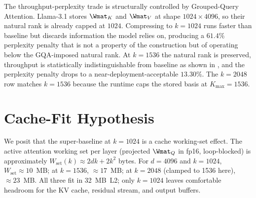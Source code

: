 \documentclass[11pt]{article}
\begin{document}
The throughput-perplexity trade is structurally controlled by Grouped-Query
Attention. Llama-3.1 stores $\Wmat_K$ and $\Wmat_V$ at shape $1024\times4096$,
so their natural rank is already capped at $1024$. Compressing to $k{=}1024$
runs faster than baseline but discards information the model relies on,
producing a $61.4\%$ perplexity penalty that is not a property of the
construction but of operating below the GQA-imposed natural rank. At
$k{=}1536$ the natural rank is preserved, throughput is statistically
indistinguishable from baseline as shown in , and the
perplexity penalty drops to a near-deployment-acceptable $13.30\%$. The
$k{=}2048$ row matches $k{=}1536$ because the runtime caps the stored basis
at $K_\text{max}{=}1536$.

\section{Cache-Fit Hypothesis}
\label{sec:cachefit}
We posit that the super-baseline at $k{=}1024$ is a cache working-set effect.
The active attention working set per layer (projected $\Wmat_Q$ in fp16,
loop-blocked) is approximately $W_\text{set}(k) \approx 2 d k\!+\!2 k^2$ bytes.
For $d{=}4096$ and $k{=}1024$, $W_\text{set}\!\approx\!10$~MB; at $k{=}1536$,
$\approx\!17$~MB; at $k{=}2048$ (clamped to 1536 here), $\approx\!23$~MB.  All
three fit in 32~MB~L2; only $k{=}1024$ leaves comfortable headroom for the KV
cache, residual stream, and output buffers.
\end{document}
